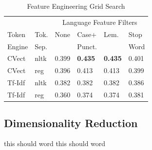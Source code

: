 \documentclass[11pt,a4paper]{article}
\begin{document}
\FloatBarrier
\begin{table}[h]
    \centering
    \caption{Feature Engineering Grid Search}
    \begin{tabular}{
    	l
        l
        l
        l
        l
        l
        }
        \toprule
        \multicolumn{2}{c}{} &
        \multicolumn{4}{c}{Language Feature Filters}\\
        \cmidrule(lr){3-6} 
        {Token}& {Tok.} &{None} &{Case+}&{Lem.}& {Stop}\\
        {Engine} & {Sep.} && {Punct.}&&{Word}\\
        \midrule
      CVect & nltk & 0.399& \textbf{0.435}& \textbf{0.435}& 0.401\\
        CVect & reg& 0.396& 0.413&0.413& 0.399\\
        Tf-Idf & nltk & 0.382&  0.382 &0.382 & 0.386\\
        Tf-Idf & reg & 0.360& 0.374 & 0.374& 0.381\\
        \bottomrule
    \end{tabular}
\end{table}
\FloatBarrier


\subsection{Dimensionality Reduction}%
\label{sub:dimensionality_reduction}

this should word \cite{pennington2014glove} this should word
\end{document}
